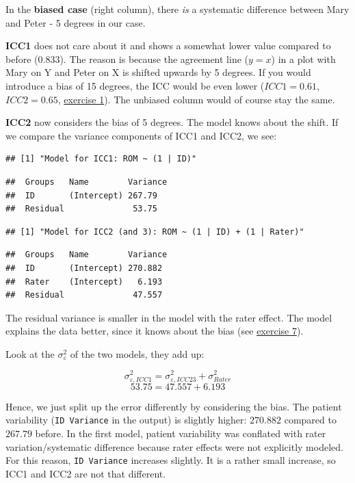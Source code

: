 \documentclass[
]{book}
\begin{document}
In the \textbf{biased case} (right column), there \emph{is} a systematic difference between Mary and Peter -
5 degrees in our case.

\textbf{ICC1} does not care about it and shows a somewhat lower value compared to
before (\(0.833\)). The reason is because the agreement line (\(y=x\)) in a plot with
Mary on Y and Peter on X is shifted upwards by 5 degrees.
If you would introduce a bias of 15 degrees, the ICC would
be even lower (\(ICC1 = 0.61\), \(ICC2 = 0.65\), \hyperref[exercise1]{exercise 1}).
The unbiased column would of course stay the same.

\textbf{ICC2} now considers the bias of 5 degrees. The model knows about the shift.
If we compare the variance components of ICC1 and ICC2, we see:

\begin{verbatim}
## [1] "Model for ICC1: ROM ~ (1 | ID)"
\end{verbatim}

\begin{verbatim}
##  Groups   Name        Variance
##  ID       (Intercept) 267.79  
##  Residual              53.75
\end{verbatim}

\begin{verbatim}
## [1] "Model for ICC2 (and 3): ROM ~ (1 | ID) + (1 | Rater)"
\end{verbatim}

\begin{verbatim}
##  Groups   Name        Variance
##  ID       (Intercept) 270.882 
##  Rater    (Intercept)   6.193 
##  Residual              47.557
\end{verbatim}

The residual variance is smaller in the model with the rater effect.
The model explains the data better, since it knows about the bias (see \hyperref[exercise7]{exercise 7}).

Look at the \(\sigma_{\varepsilon}^2\) of the two models, they add up:

\[\sigma_{\varepsilon, ICC1}^2 = \sigma_{\varepsilon, ICC23}^2 + \sigma_{Rater}^2\]
\[53.75 = 47.557 + 6.193\]

Hence, we just split up the error differently by considering the bias.
The patient variability (\texttt{ID\ Variance} in the output) is slightly higher:
\(270.882\) compared to \(267.79\) before.
In the first model, patient variability was conflated with rater variation/systematic difference
because rater effects were not explicitly modeled. For this reason,
\texttt{ID\ Variance} increases slightly.
It is a rather small increase, so ICC1 and ICC2 are not that different.
\end{document}
